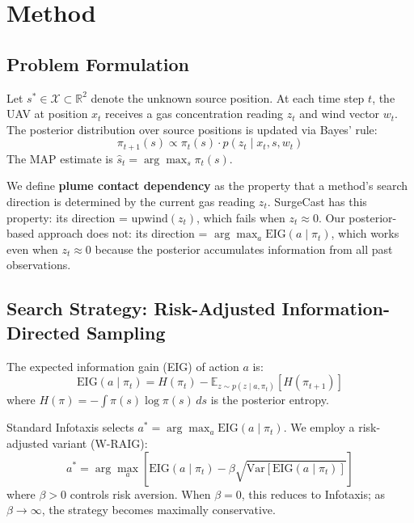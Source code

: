 \section{Method}
\label{sec:method}

\subsection{Problem Formulation}

Let $s^* \in \mathcal{X} \subset \mathbb{R}^2$ denote the unknown source position. At each time step $t$, the UAV at position $x_t$ receives a gas concentration reading $z_t$ and wind vector $w_t$. The posterior distribution over source positions is updated via Bayes' rule:
\begin{equation}
\pi_{t+1}(s) \propto \pi_t(s) \cdot p(z_t \mid x_t, s, w_t)
\label{eq:bayes}
\end{equation}
The MAP estimate is $\hat{s}_t = \arg\max_s \pi_t(s)$.

We define \textbf{plume contact dependency} as the property that a method's search direction is determined by the current gas reading $z_t$. SurgeCast has this property: its direction = $\text{upwind}(z_t)$, which fails when $z_t \approx 0$. Our posterior-based approach does not: its direction = $\arg\max_a \text{EIG}(a \mid \pi_t)$, which works even when $z_t \approx 0$ because the posterior accumulates information from all past observations.

\subsection{Search Strategy: Risk-Adjusted Information-Directed Sampling}

The expected information gain (EIG) of action $a$ is:
\begin{equation}
\text{EIG}(a \mid \pi_t) = H(\pi_t) - \mathbb{E}_{z \sim p(z \mid a, \pi_t)}[H(\pi_{t+1})]
\label{eq:eig}
\end{equation}
where $H(\pi) = -\int \pi(s) \log \pi(s) \, ds$ is the posterior entropy.

Standard Infotaxis selects $a^* = \arg\max_a \text{EIG}(a \mid \pi_t)$. We employ a risk-adjusted variant (W-RAIG):
\begin{equation}
a^* = \arg\max_a \left[ \text{EIG}(a \mid \pi_t) - \beta \sqrt{\text{Var}[\text{EIG}(a \mid \pi_t)]} \right]
\label{eq:wraig}
\end{equation}
where $\beta > 0$ controls risk aversion. When $\beta = 0$, this reduces to Infotaxis; as $\beta \to \infty$, the strategy becomes maximally conservative.

